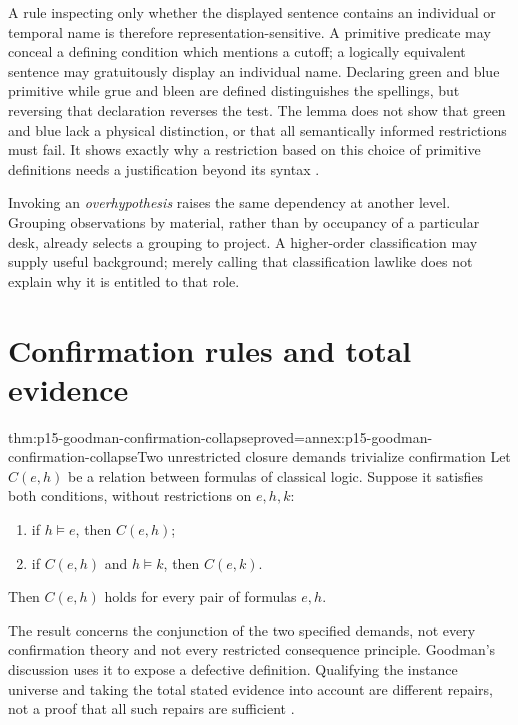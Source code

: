 A rule inspecting only whether the displayed sentence contains an
individual or temporal name is therefore representation-sensitive. A
primitive predicate may conceal a defining condition which mentions a
cutoff; a logically equivalent sentence may gratuitously display an
individual name. Declaring green and blue primitive while grue and bleen
are defined distinguishes the spellings, but reversing that declaration
reverses the test. The lemma does not show that green and blue lack a
physical distinction, or that all semantically informed restrictions
must fail. It shows exactly why a restriction based on this choice of
primitive definitions needs a justification beyond its syntax
\parencite[III, \S4]{GoodmanNewRiddleTeachingScan}.

Invoking an \emph{overhypothesis} raises the same dependency at another
level. Grouping observations by material, rather than by occupancy of
a particular desk, already selects a grouping to project. A higher-order
classification may supply useful background; merely calling that
classification lawlike does not explain why it is entitled to that role.

\section{Confirmation rules and total evidence}
\label{sec:p15-goodman-confirmation}

\begin{hbtheorem}{thm:p15-goodman-confirmation-collapse}{proved=annex:p15-goodman-confirmation-collapse}{Two unrestricted closure demands trivialize confirmation}
Let $C(e,h)$ be a relation between formulas of classical logic. Suppose
it satisfies both conditions, without restrictions on $e,h,k$:
\begin{enumerate}
\item if $h\models e$, then $C(e,h)$;
\item if $C(e,h)$ and $h\models k$, then $C(e,k)$.
\end{enumerate}
Then $C(e,h)$ holds for every pair of formulas $e,h$.
\end{hbtheorem}

The result concerns the conjunction of the two specified demands, not
every confirmation theory and not every restricted consequence principle.
Goodman's discussion uses it to expose a defective definition. Qualifying
the instance universe and taking the total stated evidence into account
are different repairs, not a proof that all such repairs are sufficient
\parencite[III, \S3]{GoodmanNewRiddleTeachingScan}.

